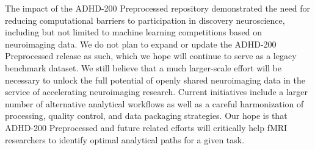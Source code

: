 \documentclass[preprint,12pt,3p]{elsarticle}
\begin{document}
The impact of the ADHD-200 Preprocessed repository demonstrated the need for reducing computational barriers to participation in discovery neuroscience, including but not limited to machine learning competitions based on neuroimaging data. We do not plan to expand or update the ADHD-200 Preprocessed release as such, which we hope will continue to serve as a legacy benchmark dataset. We still believe that a much larger-scale effort will be necessary to unlock the full potential of openly shared neuroimaging data in the service of accelerating neuroimaging research. Current initiatives include a larger number of alternative analytical workflows as well as a careful harmonization of processing, quality control, and data packaging strategies. Our hope is that ADHD-200 Preprocessed and future related efforts will critically help fMRI researchers to identify optimal analytical paths for a given task. 




% 
% 
% 
% 
% 
% 
% 
% 
% 
% 
% 
% 

%

\end{document}

